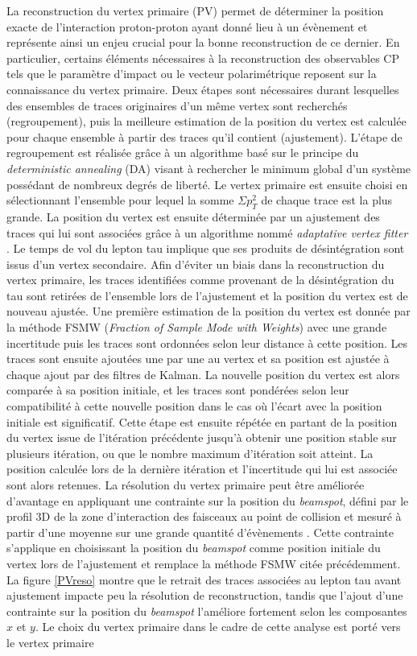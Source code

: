 La reconstruction du vertex primaire (PV) permet de déterminer la position exacte de l'interaction proton-proton ayant donné lieu à un évènement et représente ainsi un enjeu crucial pour la bonne reconstruction de ce dernier. En particulier, certains éléments nécessaires à la reconstruction des observables CP tels que le paramètre d'impact ou le vecteur polarimétrique reposent sur la connaissance du vertex primaire. Deux étapes sont nécessaires durant lesquelles des ensembles de traces originaires d'un même vertex sont recherchés (regroupement), puis la meilleure estimation de la position du vertex est calculée pour chaque ensemble à partir des traces qu'il contient (ajustement). L'étape de regroupement est réalisée grâce à un algorithme basé sur le principe du \textit{deterministic annealing} (DA) \cite{annealing} visant à rechercher le minimum global d'un système possédant de nombreux degrés de liberté. Le vertex primaire est ensuite choisi en sélectionnant l'ensemble pour lequel la somme $\Sigma p_T^2$ de chaque trace est la plus grande. La position du vertex est ensuite déterminée par un ajustement des traces qui lui sont associées grâce à un algorithme nommé \textit{adaptative vertex fitter} \cite{adaptative}. Le temps de vol du lepton tau implique que ses produits de désintégration sont issus d'un vertex secondaire. Afin d'éviter un biais dans la reconstruction du vertex primaire, les traces identifiées comme provenant de la désintégration du tau sont retirées de l'ensemble lors de l'ajustement et la position du vertex est de nouveau ajustée. Une première estimation de la position du vertex est donnée par la méthode FSMW (\textit{Fraction of Sample Mode with Weights}) \cite{adaptative} avec une grande incertitude puis les traces sont ordonnées selon leur distance à cette position. Les traces sont ensuite ajoutées une par une au vertex et sa position est ajustée à chaque ajout par des filtres de Kalman. La nouvelle position du vertex est alors comparée à sa position initiale, et les traces sont pondérées selon leur compatibilité à cette nouvelle position dans le cas où l'écart avec la position initiale est significatif. Cette étape est ensuite répétée en partant de la position du vertex issue de l'itération précédente jusqu'à obtenir une position stable sur plusieurs itération, ou que le nombre maximum d'itération soit atteint. La position calculée lors de la dernière itération et l'incertitude qui lui est associée sont alors retenues. La résolution du vertex primaire peut être améliorée d'avantage en appliquant une contrainte sur la position du \textit{beamspot}, défini par le profil 3D de la zone d'interaction des faisceaux au point de collision et mesuré à partir d'une moyenne sur une grande quantité d'évènements \cite{adaptative}. Cette contrainte s'applique en choisissant la position du \textit{beamspot} comme position initiale du vertex lors de l'ajustement et remplace la méthode FSMW citée précédemment. La figure \ref{PVreso} montre que le retrait des traces associées au lepton tau avant ajustement impacte peu la résolution de reconstruction, tandis que l'ajout d'une contrainte sur la position du \textit{beamspot} l'améliore fortement selon les composantes $x$ et $y$. Le choix du vertex primaire dans le cadre de cette analyse est porté vers le vertex primaire 